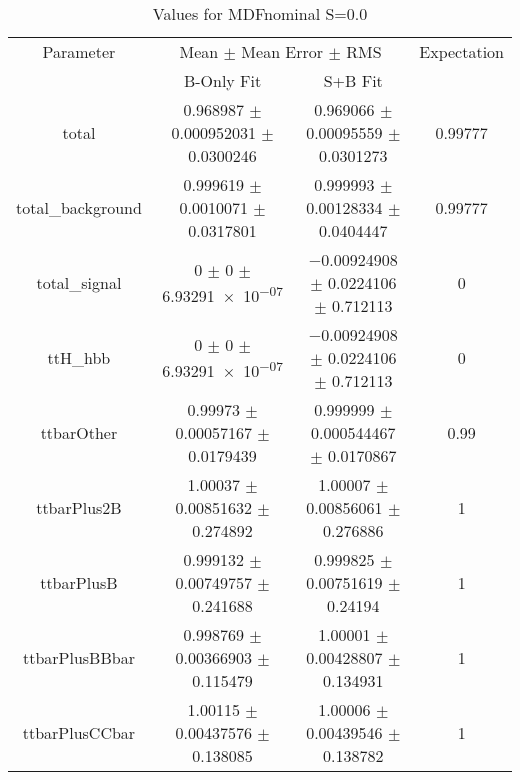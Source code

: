 \begin{table}
\centering
\caption{Values for MDFnominal S=0.0}
\begin{tabular}{cccc}
\toprule
Parameter & \multicolumn{2}{c}{Mean $\pm$ Mean Error $\pm$ RMS} & Expectation\\
 & B-Only Fit & S+B Fit & \\
\midrule
total & \num{0.968987} $\pm$ \num{0.000952031} $\pm$ \num{0.0300246} & \num{0.969066} $\pm$ \num{0.00095559} $\pm$ \num{0.0301273} & \num{0.99777}\\
total\_background & \num{0.999619} $\pm$ \num{0.0010071} $\pm$ \num{0.0317801} & \num{0.999993} $\pm$ \num{0.00128334} $\pm$ \num{0.0404447} & \num{0.99777}\\
total\_signal & \num{0} $\pm$ \num{0} $\pm$ \num{6.93291e-07} & \num{-0.00924908} $\pm$ \num{0.0224106} $\pm$ \num{0.712113} & \num{0}\\
ttH\_hbb & \num{0} $\pm$ \num{0} $\pm$ \num{6.93291e-07} & \num{-0.00924908} $\pm$ \num{0.0224106} $\pm$ \num{0.712113} & \num{0}\\
ttbarOther & \num{0.99973} $\pm$ \num{0.00057167} $\pm$ \num{0.0179439} & \num{0.999999} $\pm$ \num{0.000544467} $\pm$ \num{0.0170867} & \num{0.99}\\
ttbarPlus2B & \num{1.00037} $\pm$ \num{0.00851632} $\pm$ \num{0.274892} & \num{1.00007} $\pm$ \num{0.00856061} $\pm$ \num{0.276886} & \num{1}\\
ttbarPlusB & \num{0.999132} $\pm$ \num{0.00749757} $\pm$ \num{0.241688} & \num{0.999825} $\pm$ \num{0.00751619} $\pm$ \num{0.24194} & \num{1}\\
ttbarPlusBBbar & \num{0.998769} $\pm$ \num{0.00366903} $\pm$ \num{0.115479} & \num{1.00001} $\pm$ \num{0.00428807} $\pm$ \num{0.134931} & \num{1}\\
ttbarPlusCCbar & \num{1.00115} $\pm$ \num{0.00437576} $\pm$ \num{0.138085} & \num{1.00006} $\pm$ \num{0.00439546} $\pm$ \num{0.138782} & \num{1}\\
\bottomrule
\end{tabular}
\end{table}